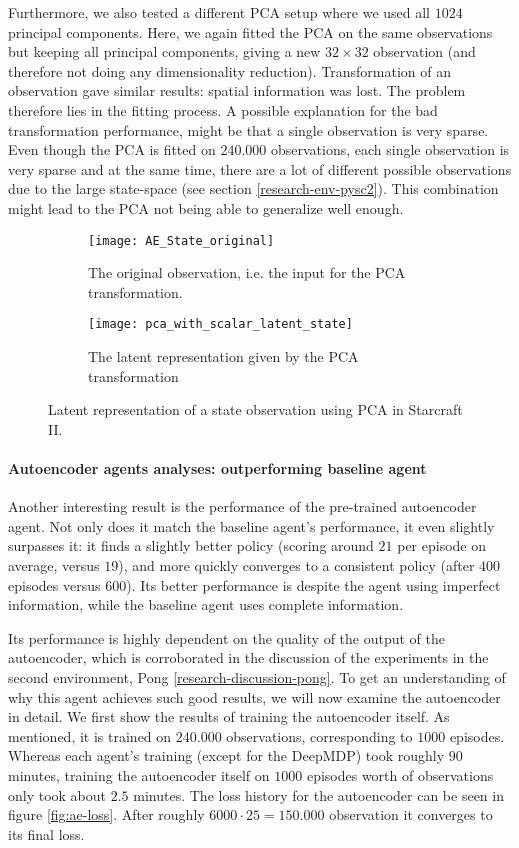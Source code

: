 Furthermore, we also tested a different PCA setup where we used all $1024$ principal components. Here, we again fitted the PCA on the same observations but keeping all principal components, giving a new $32 \times 32$ observation (and therefore not doing any dimensionality reduction). Transformation of an observation gave similar results: spatial information was lost. The problem therefore lies in the fitting process. A possible explanation for the bad transformation performance, might be that a single observation is very sparse. Even though the PCA is fitted on $240.000$ observations, each single observation is very sparse and at the same time, there are a lot of different possible observations due to the large state-space (see section \ref{research-env-pysc2}). This combination might lead to the PCA not being able to generalize well enough.

\begin{figure}[h!]
	\centering
	\begin{subfigure}[b]{0.3\textwidth}
		\texttt{[image: AE\_State\_original]}
		\caption{The original observation, i.e. the input for the PCA transformation.}
		\label{fig:pca-original} 
	\end{subfigure}\hfill
	\begin{subfigure}[b]{0.3\textwidth}
	\texttt{[image: pca\_with\_scalar\_latent\_state]}
		\caption{The latent representation given by the PCA transformation}
		\label{fig:pca-latent}
	\end{subfigure}
	\caption{Latent representation of a state observation using PCA in Starcraft II.}
	\label{fig:pca-state}
\end{figure}

\paragraph{Autoencoder agents analyses: outperforming baseline agent}
Another interesting result is the performance of the pre-trained autoencoder agent. Not only does it match the baseline agent's performance, it even slightly surpasses it: it finds a slightly better policy (scoring around $21$ per episode on average, versus $19$), and more quickly converges to a consistent policy (after $400$ episodes versus $600$). Its better performance is despite the agent using imperfect information, while the baseline agent uses complete information.

Its performance is highly dependent on the quality of the output of the autoencoder, which is corroborated in the discussion of the experiments in the second environment, Pong \ref{research-discussion-pong}. To get an understanding of why this agent achieves such good results, we will now examine the autoencoder in detail. We first show the results of training the autoencoder itself. As mentioned, it is trained on $240.000$ observations, corresponding to $1000$ episodes. Whereas each agent's training (except for the DeepMDP) took roughly $90$ minutes, training the autoencoder itself on $1000$ episodes worth of observations only took about $2.5$ minutes. The loss history for the autoencoder can be seen in figure \ref{fig:ae-loss}. After roughly $6000 \cdot 25 = 150.000$ observation it converges to its final loss.

